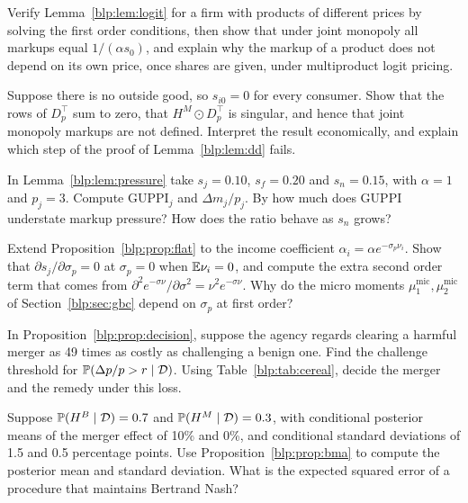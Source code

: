 \begin{exercises}
\item\label{ex:chapter_blp:1}\label{blp:ex:logit} Verify Lemma~\ref{blp:lem:logit} for a firm with products of different prices by solving the first order conditions, then show that under joint monopoly all markups equal $1/(\alpha s_0)$, and explain why the markup of a product does not depend on its own price, once shares are given, under multiproduct logit pricing.

\item\label{ex:chapter_blp:2}\label{blp:ex:outside} Suppose there is no outside good, so $s_{i0}=0$ for every consumer.
Show that the rows of $D_p^\top$ sum to zero, that $H^M\odot D_p^\top$ is singular, and hence that
joint monopoly markups are not defined. Interpret the result economically, and explain which step
of the proof of Lemma~\ref{blp:lem:dd} fails.

\item\label{ex:chapter_blp:3}\label{blp:ex:guppi} In Lemma~\ref{blp:lem:pressure} take $s_j = 0.10$, $s_f = 0.20$ and
$s_n = 0.15$, with $\alpha = 1$ and $p_j = 3$. Compute $\mathrm{GUPPI}_j$ and $\Delta m_j/p_j$.
By how much does GUPPI understate markup pressure? How does the ratio behave as $s_n$ grows?

\item\label{ex:chapter_blp:4}\label{blp:ex:flat} Extend Proposition~\ref{blp:prop:flat} to the income coefficient
$\alpha_i = \alpha e^{-\sigma_p\nu_i}$. Show that $\partial s_j/\partial\sigma_p = 0$ at
$\sigma_p = 0$ when $\mathbb{E}\nu_i = 0$, and compute the extra second order term that comes from
$\partial^2 e^{-\sigma\nu}/\partial\sigma^2 = \nu^2 e^{-\sigma\nu}$. Why do the micro moments
$\mu^{\mathrm{mic}}_1,\mu^{\mathrm{mic}}_2$ of Section~\ref{blp:sec:gbc} depend on $\sigma_p$ at first order?

\item\label{ex:chapter_blp:5}\label{blp:ex:bayesrule} In Proposition~\ref{blp:prop:decision}, suppose the agency regards
clearing a harmful merger as 49 times as costly as challenging a benign one. Find the
challenge threshold for $\mathbb{P}(\Delta p/p > r\mid\mathcal{D})$. Using Table~\ref{blp:tab:cereal}, decide the
merger and the remedy under this loss.

\item\label{ex:chapter_blp:6}\label{blp:ex:bma} Suppose $\mathbb{P}(H^B\mid\mathcal{D}) = 0.7$ and $\mathbb{P}(H^M\mid\mathcal{D}) = 0.3$, with
conditional posterior means of the merger effect of 10\% and 0\%, and conditional standard
deviations of 1.5 and 0.5 percentage points. Use Proposition~\ref{blp:prop:bma} to compute the
posterior mean and standard deviation. What is the expected squared error of a procedure that
maintains Bertrand Nash?


\end{exercises}
